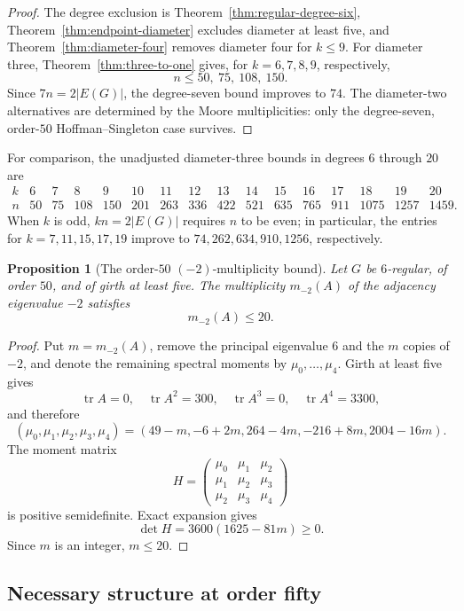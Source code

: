 \documentclass[a4paper,10pt,reqno]{amsart}
\theoremstyle{plain}
\newtheorem{proposition}[theorem]{Proposition}
\theoremstyle{definition}
\theoremstyle{remark}
\newcommand{\tr}{\operatorname{tr}}
\begin{document}
\begin{proof}
The degree exclusion is Theorem~\ref{thm:regular-degree-six},
Theorem~\ref{thm:endpoint-diameter} excludes diameter at least five, and
Theorem~\ref{thm:diameter-four} removes diameter four for \(k\le9\).
 For diameter three, Theorem~\ref{thm:three-to-one} gives, for
\(k=6,7,8,9\), respectively,
\[
 n\le50,\ 75,\ 108,\ 150.
\]
Since \(7n=2|E(G)|\), the degree-seven bound improves to \(74\).  The
diameter-two alternatives are determined by the Moore multiplicities: only
the degree-seven, order-\(50\) Hoffman--Singleton case survives.
\end{proof}

For comparison, the unadjusted diameter-three bounds in degrees \(6\) through
\(20\) are
\[
\begin{array}{c|rrrrrrrrrrrrrrr}
 k&6&7&8&9&10&11&12&13&14&15&16&17&18&19&20\\
 \hline
 n&50&75&108&150&201&263&336&422&521&635&765&911&1075&1257&1459.
\end{array}
\]
When \(k\) is odd, \(kn=2|E(G)|\) requires \(n\) to be even; in particular,
the entries for \(k=7,11,15,17,19\) improve to
\(74,262,634,910,1256\), respectively.

\begin{proposition}[The order-\(50\) \((-2)\)-multiplicity bound]
\label{prop:order50-minus-two}
Let \(G\) be \(6\)-regular, of order \(50\), and of girth at least five.
The multiplicity \(m_{-2}(A)\) of the adjacency eigenvalue \(-2\) satisfies
\[
 m_{-2}(A)\le20.
\]
\end{proposition}

\begin{proof}
Put \(m=m_{-2}(A)\), remove the principal eigenvalue \(6\) and the \(m\)
copies of \(-2\), and denote the remaining spectral moments by
\(\mu_0,\ldots,\mu_4\).  Girth at least five gives
\[
 \tr A=0,\quad \tr A^2=300,\quad \tr A^3=0,\quad \tr A^4=3300,
\]
and therefore
\[
 (\mu_0,\mu_1,\mu_2,\mu_3,\mu_4)
 =(49-m,-6+2m,264-4m,-216+8m,2004-16m).
\]
The moment matrix
\[
 H=\begin{pmatrix}
 \mu_0&\mu_1&\mu_2\\
 \mu_1&\mu_2&\mu_3\\
 \mu_2&\mu_3&\mu_4
 \end{pmatrix}
\]
is positive semidefinite.  Exact expansion gives
\[
 \det H=3600(1625-81m)\ge0.
\]
Since \(m\) is an integer, \(m\le20\).
\end{proof}

\subsection{Necessary structure at order fifty}
\end{document}
